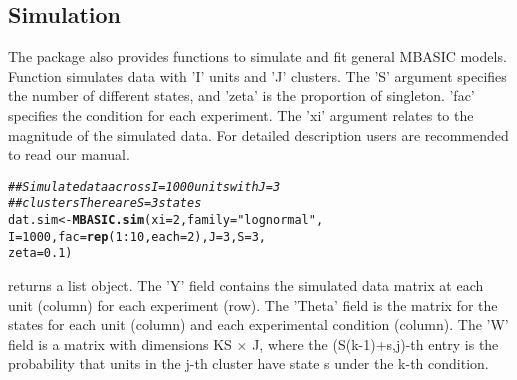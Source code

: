 \documentclass[a4paper,10pt]{article}\usepackage[]{graphicx}\usepackage[]{color}
\makeatletter
\newcommand{\hlnum}[1]{\textcolor[rgb]{0.686,0.059,0.569}{#1}}%
\newcommand{\hlstr}[1]{\textcolor[rgb]{0.192,0.494,0.8}{#1}}%
\newcommand{\hlcom}[1]{\textcolor[rgb]{0.678,0.584,0.686}{\textit{#1}}}%
\newcommand{\hlopt}[1]{\textcolor[rgb]{0,0,0}{#1}}%
\newcommand{\hlstd}[1]{\textcolor[rgb]{0.345,0.345,0.345}{#1}}%
\newcommand{\hlkwb}[1]{\textcolor[rgb]{0.69,0.353,0.396}{#1}}%
\newcommand{\hlkwc}[1]{\textcolor[rgb]{0.333,0.667,0.333}{#1}}%
\newcommand{\hlkwd}[1]{\textcolor[rgb]{0.737,0.353,0.396}{\textbf{#1}}}%
\newenvironment{kframe}{%
 \def\at@end@of@kframe{}%
 \ifinner\ifhmode%
  \def\at@end@of@kframe{\end{minipage}}%
  \begin{minipage}{\columnwidth}%
 \fi\fi%
 \def\FrameCommand##1{\hskip\@totalleftmargin \hskip-\fboxsep
 \colorbox{shadecolor}{##1}\hskip-\fboxsep
     \hskip-\linewidth \hskip-\@totalleftmargin \hskip\columnwidth}%
 \MakeFramed {\advance\hsize-\width
   \@totalleftmargin\z@ \linewidth\hsize
   \@setminipage}}%
 {\par\unskip\endMakeFramed%
 \at@end@of@kframe}
\newenvironment{knitrout}{}{} %
\makeatother
\begin{document}
\subsection{Simulation}\label{sec:sim}

The  package also provides functions to simulate and fit general MBASIC models. Function  simulates data with 'I' units and 'J' clusters. The 'S' argument specifies the number of different states, and 'zeta' is the proportion of singleton. 'fac' specifies the condition for each experiment. The 'xi' argument relates to the magnitude of the simulated data. For detailed description users are recommended to read our manual.

\begin{knitrout}
\color{fgcolor}\begin{kframe}
\begin{alltt}
\hlcom{## Simulate data across I=1000 units with J=3}
\hlcom{## clusters There are S=3 states}
\hlstd{dat.sim} \hlkwb{<-} \hlkwd{MBASIC.sim}\hlstd{(}\hlkwc{xi} \hlstd{=} \hlnum{2}\hlstd{,} \hlkwc{family} \hlstd{=} \hlstr{"lognormal"}\hlstd{,}
    \hlkwc{I} \hlstd{=} \hlnum{1000}\hlstd{,} \hlkwc{fac} \hlstd{=} \hlkwd{rep}\hlstd{(}\hlnum{1}\hlopt{:}\hlnum{10}\hlstd{,} \hlkwc{each} \hlstd{=} \hlnum{2}\hlstd{),} \hlkwc{J} \hlstd{=} \hlnum{3}\hlstd{,} \hlkwc{S} \hlstd{=} \hlnum{3}\hlstd{,}
    \hlkwc{zeta} \hlstd{=} \hlnum{0.1}\hlstd{)}
\end{alltt}
\end{kframe}
\end{knitrout}

 returns a list object. The 'Y' field contains the simulated data matrix at each unit (column) for each experiment (row). The 'Theta' field is the matrix for the states for each unit (column) and each experimental condition (column). The 'W' field is a matrix with dimensions KS $\times$ J, where the (S(k-1)+s,j)-th entry is the probability that units in the j-th cluster have state s under the k-th condition.
\end{document}
